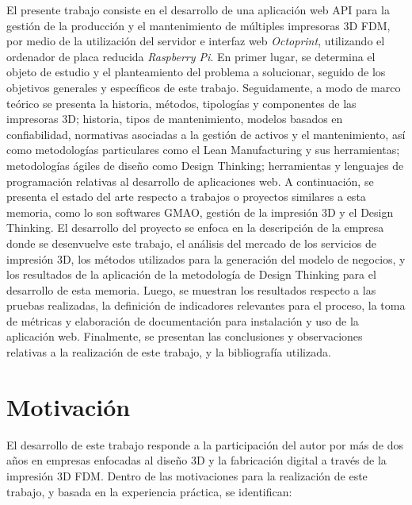 El presente trabajo consiste en el desarrollo de una aplicación web API para la gestión de la producción y el mantenimiento de múltiples impresoras 3D FDM, por medio de la utilización del servidor e interfaz web \textit{Octoprint}, utilizando el ordenador de placa reducida \textit{Raspberry Pi}.  
En primer lugar, se determina el objeto de estudio y el planteamiento del problema a solucionar, seguido de los objetivos generales y específicos de este trabajo. Seguidamente, a modo de marco teórico se presenta la historia, métodos, tipologías y componentes de las impresoras 3D; historia, tipos de mantenimiento, modelos basados en confiabilidad, normativas asociadas a la gestión de activos y el mantenimiento, así como metodologías particulares como el Lean Manufacturing y sus herramientas; metodologías ágiles de diseño como Design Thinking; herramientas y lenguajes de programación relativas al desarrollo de aplicaciones web. A continuación, se presenta el estado del arte respecto a trabajos o proyectos similares a esta memoria, como lo son softwares GMAO, gestión de la impresión 3D y el Design Thinking. El desarrollo del proyecto se enfoca en la descripción de la empresa donde se desenvuelve este trabajo, el análisis del mercado de los servicios de impresión 3D, los métodos utilizados para la generación del modelo de negocios, y los resultados de la aplicación de la metodología de Design Thinking para el desarrollo de esta memoria. Luego, se muestran los resultados respecto a las pruebas realizadas, la definición de indicadores relevantes para el proceso, la toma de métricas y elaboración de documentación para instalación y uso de la aplicación web. Finalmente, se presentan las conclusiones y observaciones relativas a la realización de este trabajo, y la bibliografía utilizada. 


\section{Motivación}

El desarrollo de este trabajo responde a la participación del autor por más de dos años en empresas enfocadas al diseño 3D y la fabricación digital a través de la impresión 3D FDM. Dentro de las motivaciones para la realización de este trabajo, y basada en la experiencia práctica, se identifican:

